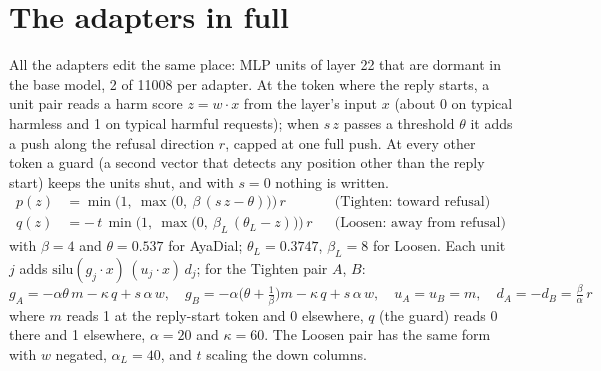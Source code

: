 \documentclass[10pt,a4paper]{article}
\begin{document}
\section{The adapters in full}\label{app:adapters}
\setlength{\abovedisplayskip}{4pt}\setlength{\belowdisplayskip}{4pt}
All the adapters edit the same place: MLP units of layer 22 that are dormant in the base model, 2 of 11008 per adapter. At the token where the reply starts, a unit pair reads a harm score $z = w \cdot x$ from the layer's input $x$ (about 0 on typical harmless and 1 on typical harmful requests); when $s\,z$ passes a threshold $\theta$ it adds a push along the refusal direction $r$, capped at one full push. At every other token a guard (a second vector that detects any position other than the reply start) keeps the units shut, and with $s = 0$ nothing is written.
\begin{align*}
p(z) &= \min\bigl(1,\ \max\bigl(0,\ \beta\,(s\,z-\theta)\bigr)\bigr)\, r && \text{(Tighten: toward refusal)}\\
q(z) &= -\,t\,\min\bigl(1,\ \max\bigl(0,\ \beta_L\,(\theta_L-z)\bigr)\bigr)\, r && \text{(Loosen: away from refusal)}
\end{align*}
with $\beta = 4$ and $\theta = 0.537$ for AyaDial; $\theta_L = 0.3747$, $\beta_L = 8$ for Loosen. Each unit $j$ adds $\mathrm{silu}(g_j \cdot x)\,(u_j \cdot x)\,d_j$; for the Tighten pair $A$, $B$:
\[ g_A = -\alpha\theta\,m - \kappa\,q + s\,\alpha\,w,\quad g_B = -\alpha\bigl(\theta + \tfrac{1}{\beta}\bigr)m - \kappa\,q + s\,\alpha\,w,\quad u_A = u_B = m,\quad d_A = -d_B = \tfrac{\beta}{\alpha}\,r \]
where $m$ reads 1 at the reply-start token and 0 elsewhere, $q$ (the guard) reads 0 there and 1 elsewhere, $\alpha = 20$ and $\kappa = 60$. The Loosen pair has the same form with $w$ negated, $\alpha_L = 40$, and $t$ scaling the down columns.
\end{document}
